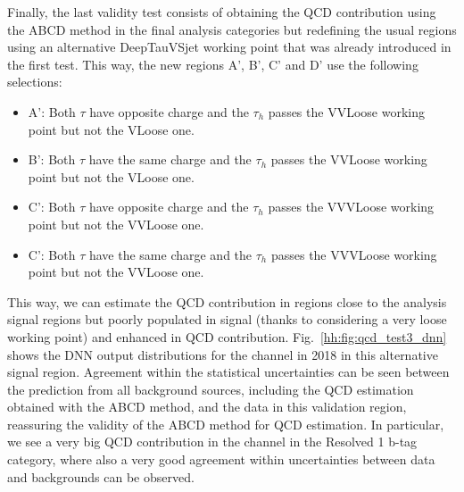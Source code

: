 \documentclass[../main.tex]{subfiles}
\begin{document}
Finally, the last validity test consists of obtaining the QCD contribution using the ABCD method in the final analysis categories but redefining the usual regions using an alternative DeepTauVSjet working point that was already introduced in the first test. This way, the new regions A', B', C' and D' use the following selections:
\begin{itemize}
	\item A': Both $\tau$ have opposite charge and the $\tau_h$ passes the VVLoose working point but not the VLoose one.
	\item B': Both $\tau$ have the same charge and the $\tau_h$ passes the VVLoose working point but not the VLoose one.
	\item C': Both $\tau$ have opposite charge and the $\tau_h$ passes the VVVLoose working point but not the VVLoose one.
	\item C': Both $\tau$ have the same charge and the $\tau_h$ passes the VVVLoose working point but not the VVLoose one.
\end{itemize}

This way, we can estimate the QCD contribution in regions close to the analysis signal regions but poorly populated in signal (thanks to considering a very loose working point) and enhanced in QCD contribution. Fig.~\ref{hh:fig:qcd_test3_dnn} shows the DNN output distributions for the \tauh\tauh{} channel in 2018 in this alternative signal region. Agreement within the statistical uncertainties can be seen between the prediction from all background sources, including the QCD estimation obtained with the ABCD method, and the data in this validation region, reassuring the validity of the ABCD method for QCD estimation. In particular, we see a very big QCD contribution in the \tauh\tauh{} channel in the Resolved 1 b-tag category, where also a very good agreement within uncertainties between data and backgrounds can be observed.
\end{document}

